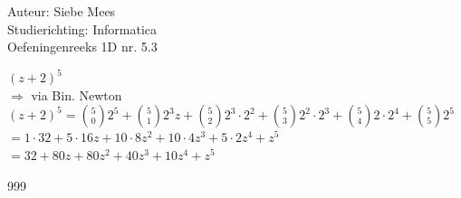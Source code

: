 \documentclass[a4paper]{article}
\begin{document}
  
\noindent \large Auteur: Siebe Mees \\
\noindent \large Studierichting: Informatica\\
\noindent \large Oefeningenreeks 1D nr. 5.3\\

\medskip

\normalsize

$ (z+2)^5 $\\

$\Rightarrow  $ via Bin. Newton \\

$ (z+2)^5 = \binom{5}{0}2^5 + \binom{5}{1}2^3z + \binom{5}{2}2^3\cdot 2^2 + \binom{5}{3}2^2\cdot 2^3 + \binom{5}{4}2\cdot 2^4 + \binom{5}{5}2^5 $\\

$ = 1 \cdot 32 + 5 \cdot 16z + 10 \cdot 8z^2 + 10 \cdot 4z^3 + 5 \cdot 2z^4 + z^5 $\\

$ = 32 + 80z + 80z^2 + 40z^3 + 10z^4 + z^5 $\\


\begin{thebibliography}{999}

\end{thebibliography}
\end{document}
